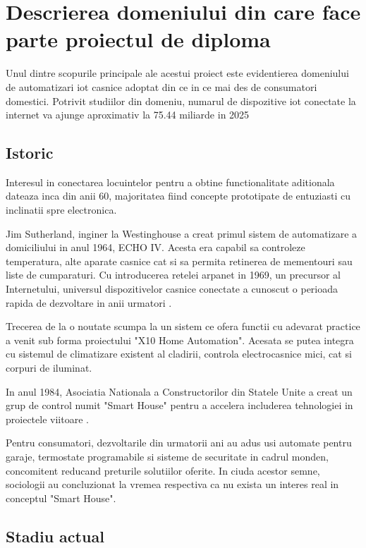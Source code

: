 \section {Descrierea domeniului din care face parte proiectul de diploma}

Unul dintre scopurile principale ale acestui proiect este evidentierea domeniului de automatizari \acrshort{iot} casnice adoptat din ce in ce mai des de consumatori domestici. Potrivit studiilor din domeniu, numarul de dispozitive \acrshort{iot} conectate la internet va ajunge aproximativ la 75.44 miliarde in 2025 \cite{AlamTanweer2018}

\subsection {Istoric}

Interesul in conectarea locuintelor pentru a obtine functionalitate aditionala dateaza inca din anii 60, majoritatea fiind concepte prototipate de entuziasti cu inclinatii spre electronica.

Jim Sutherland, inginer la Westinghouse a creat primul sistem de automatizare a domiciliului in anul 1964, ECHO IV. Acesta era capabil sa controleze temperatura, alte aparate casnice cat si sa permita retinerea de mementouri sau liste de cumparaturi. Cu introducerea retelei \acrfull{arpanet} in 1969, un precursor al Internetului, universul dispozitivelor casnice conectate a cunoscut o perioada rapida de dezvoltare in anii urmatori \cite{ZeusIntegratedSystems}.

Trecerea de la o noutate scumpa la un sistem ce ofera functii cu adevarat practice a venit sub forma proiectului "X10 Home Automation". Acesata se putea integra cu sistemul de climatizare existent al cladirii, controla electrocasnice mici, cat si corpuri de iluminat.

In anul 1984, Asociatia Nationala a Constructorilor din Statele Unite a creat un grup de control numit "Smart House" pentru a accelera includerea tehnologiei in proiectele viitoare \cite{Aldrich2003Smart}.

Pentru consumatori, dezvoltarile din urmatorii ani au adus usi automate pentru garaje, termostate programabile si sisteme de securitate in cadrul monden, concomitent reducand preturile solutiilor oferite. In ciuda acestor semne, sociologii au concluzionat la vremea respectiva ca nu exista un interes real in conceptul "Smart House".


\subsection {Stadiu actual}

